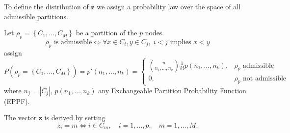 \begin{frame}
To define the distribution of $\bm{z}$ we assign a probability law over the space of all \alert{admissible} partitions.

\pause

Let $\rho_p=\left\{C_1, \ldots, C_M\right\}$ be a partition of the $p$ nodes.
\[
    \rho_p \text{ is admissible} \iff \forall x \in C_i, y \in C_{j}, \; i<j \text{ implies } x < y
\]
\pause
\cite{martinezNonparametricChangePoint2014} assign
\begin{equation*}
    P\left(\rho_p=\left\{C_1, \ldots, C_M\right\}\right)
    =
    p'(n_1, \ldots, n_k)=
    \begin{cases}
        \binom{n}{n_1, \ldots, n_k} \frac{1}{k !} p(n_1, \ldots, n_k), & \rho_p \text{ admissible}\\
        0, & \rho_p \text{ not admissible}
    \end{cases}
\end{equation*}
where $n_j=\left|C_j\right|$, $p(n_1, \ldots, n_k)$ any Exchangeable Partition Probability Function (EPPF).\pause

The vector $\bm{z}$ is derived by setting
\[
z_i=m \iff i \in C_m, \quad i=1, \ldots, p, \quad m=1, \ldots, M.
\]
\end{frame}







